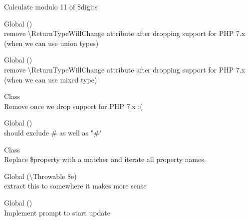 \begin{DoxyRefList}
\label{todo__todo000008}%
%
Calculate modulo 11 of \$digits 
\item[Global \doxylink{class_psy_1_1_reflection_1_1_reflection_language_construct_afdeebfe3fcf5806fc79c074a6a3a6eb1}{Reflection\+Language\+Construct\+::get\+File\+Name} ()]\hfill \\
\label{todo__todo000030}%
%
remove \textbackslash{}\+Return\+Type\+Will\+Change attribute after dropping support for PHP 7.\+x (when we can use union types) 
\item[Global \doxylink{class_psy_1_1_reflection_1_1_reflection_language_construct_parameter_af9b9401c63918169457fe8516324950f}{Reflection\+Language\+Construct\+Parameter\+::get\+Default\+Value} ()]\hfill \\
\label{todo__todo000031}%
%
remove \textbackslash{}\+Return\+Type\+Will\+Change attribute after dropping support for PHP 7.\+x (when we can use mixed type) 
\item[Class \doxylink{class_psy_1_1_execution_loop_1_1_runkit_reloader}{Runkit\+Reloader} ]\hfill \\
\label{todo__todo000027}%
%
Remove  once we drop support for PHP 7.\+x \+:(  
\item[Global \doxylink{class_sabberworm_1_1_c_s_s_1_1_property_1_1_selector_a03ce0fd457be7042f467e21a33a2cd2b}{Selector\+::get\+Specificity} ()]\hfill \\
\label{todo__todo000035}%
%
should exclude \# as well as "{}\#"{}  
\item[Class \doxylink{class_hamcrest_1_1_core_1_1_set}{Set} ]\hfill \\
\label{todo__todo000013}%
%
Replace \$property with a matcher and iterate all property names.  
\item[Global \doxylink{class_psy_1_1_shell_a25da25227ebf0a908cf1682c6df4ec1c}{Shell\+::format\+Exception} (\textbackslash{}Throwable \$e)]\hfill \\
\label{todo__todo000032}%
%
extract this to somewhere it makes more sense 
\item[Global \doxylink{class_psy_1_1_shell_acf4d88742cef734b9a59b048e6e3d215}{Shell\+::write\+Version\+Info} ()]\hfill \\
\label{todo__todo000033}%
%
Implement prompt to start update 

\end{DoxyRefList}
